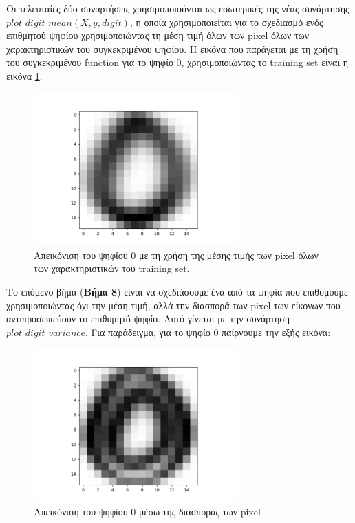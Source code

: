 \documentclass[11pt]{article} %
\begin{document}
Οι τελευταίες δύο συναρτήσεις χρησιμοποιούνται ως εσωτερικές της νέας συνάρτησης $plot\_digit\_mean(X, y, digit)$, η οποία χρησιμοποιείται για το σχεδιασμό ενός επιθμητού ψηφίου χρησιμοποιώντας τη μέση τιμή όλων των pixel όλων των χαρακτηριστικών του συγκεκριμένου ψηφίου. Η εικόνα που παράγεται με τη χρήση του συγκεκριμένου function για το ψηφίο 0, χρησιμοποιώντας το training set είναι η εικόνα \ref{fig:step_7}.

\begin{figure}[H]
    \centering
    \includegraphics[width=0.7\textwidth]{plots/Step 7}
    \caption{Απεικόνιση του ψηφίου 0 με τη χρήση της μέσης τιμής των pixel όλων των χαρακτηριστικών του training set.}
    \label{fig:step_7}
\end{figure}

Το επόμενο βήμα (\textbf{Βήμα 8}) είναι να σχεδιάσουμε ένα από τα ψηφία που επιθυμούμε χρησιμοποιώντας όχι την μέση τιμή, αλλά την διασπορά των pixel των είκονων που αντιπροσωπεύουν το επιθυμητό ψηφίο. Αυτό γίνεται με την συνάρτηση $plot\_digit\_variance$. Για παράδειγμα, για το ψηφίο $0$ παίρνουμε την εξής εικόνα:

\begin{figure}[H]
    \centering
    \includegraphics[width=0.7\textwidth]{plots/variance_0}
    \caption{Απεικόνιση του ψηφίου $0$ μέσω της διασποράς των pixel}
    \label{fig:var_0}
\end{figure}
\end{document}
